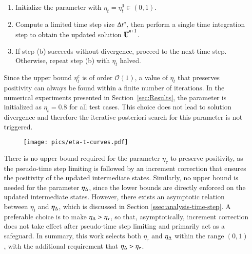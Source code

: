 \begin{enumerate} [label=(\alph*)]
\item Initialize the parameter with $\eta_t = \eta^0_t \in (0, 1)$.
\item Compute a limited time step size $\mathrm\Delta t^n$, then perform a single time integration step to obtain the updated solution $\overline{\mathbf{U}}^{n+1}$.
\item If step (b) succeeds without divergence, proceed to the next time step. Otherwise, repeat step (b) with $\eta_t$ halved.
\end{enumerate}
Since the upper bound $\eta^c_t$ is of order $\mathcal{O}(1)$, a value of $\eta_t$ that preserves positivity can always be found within a finite number of iterations. 
In the numerical experiments presented in Section~\ref{sec:Results}, the parameter is initialized as $\eta_t = 0.8$ for all test cases. 
This choice does not lead to solution divergence and therefore the iterative posteriori search for this parameter is not triggered.

\begin{figure}[htbp!]
    \centering
    \texttt{[image: pics/eta-t-curves.pdf]}
    \caption{}
    \label{fig:eta-t-curves}
\end{figure}

There is no upper bound required for the parameter $\eta_\tau$ to preserve positivity, 
as the pseudo-time step limiting is followed by an increment correction 
that ensures the positivity of the updated intermediate states. 
Similarly, no upper bound is needed for the parameter $\eta_{\mathrm\Delta}$, 
since the lower bounds are directly enforced on the updated intermediate states. 
However, there exists an asymptotic relation between $\eta_t$ and $\eta_\mathrm\Delta$,
which is discussed in Section \ref{ssec:analysis-time-step}.
A preferable choice is to make $\eta_\mathrm\Delta > \eta_\tau$, so that,
asymptotically, increment correction does not take effect after 
pseudo-time step limiting and primarily act as a safeguard.
In summary, this work selects both $\eta_\tau$ and $\eta_{\mathrm\Delta}$ within the range $(0,1)$, with the additional requirement that $\eta_{\mathrm\Delta} > \eta_\tau$.

